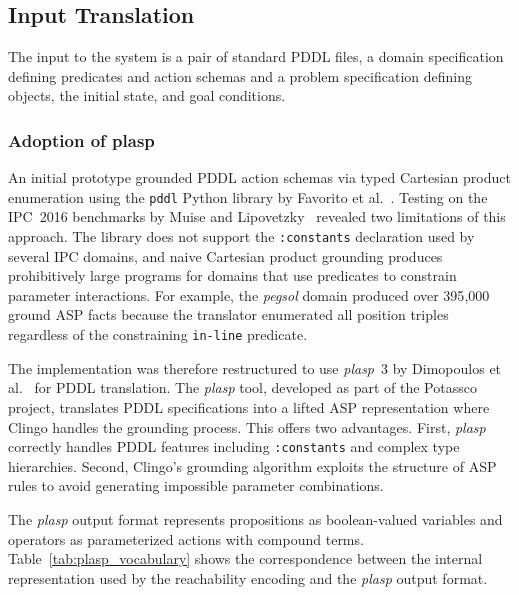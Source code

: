 \subsection{Input Translation}
\label{sec:pddl_translation}

The input to the system is a pair of standard \ac{PDDL} files, a domain specification defining predicates and action schemas and a problem specification defining objects, the initial state, and goal conditions.

\subsubsection{Adoption of plasp}
\label{sec:plasp_adoption}

An initial prototype grounded \ac{PDDL} action schemas via typed Cartesian product enumeration using the \texttt{pddl} Python library by Favorito et al.~\cite{Favorito2021}. Testing on the \ac{IPC}~2016 benchmarks by Muise and Lipovetzky~\cite{Muise2016} revealed two limitations of this approach. The library does not support the \texttt{:constants} declaration used by several \ac{IPC} domains, and naive Cartesian product grounding produces prohibitively large programs for domains that use predicates to constrain parameter interactions. For example, the \textit{pegsol} domain produced over 395{,}000 ground \ac{ASP} facts because the translator enumerated all position triples regardless of the constraining \texttt{in-line} predicate.

The implementation was therefore restructured to use \textit{plasp}~3 by Dimopoulos et al.~\cite{Dimopoulos2019} for \ac{PDDL} translation. The \textit{plasp} tool, developed as part of the Potassco project, translates \ac{PDDL} specifications into a lifted \ac{ASP} representation where Clingo handles the grounding process. This offers two advantages. First, \textit{plasp} correctly handles \ac{PDDL} features including \texttt{:constants} and complex type hierarchies. Second, Clingo's grounding algorithm exploits the structure of \ac{ASP} rules to avoid generating impossible parameter combinations.

The \textit{plasp} output format represents propositions as boolean-valued variables and operators as parameterized actions with compound terms. Table~\ref{tab:plasp_vocabulary} shows the correspondence between the internal representation used by the reachability encoding and the \textit{plasp} output format.

